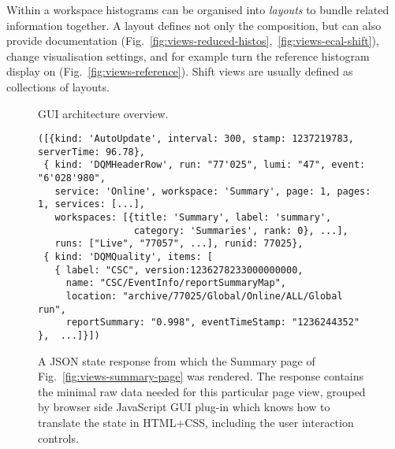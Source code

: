 \documentclass[a4paper]{jpconf}
\begin{document}
Within a workspace histograms can be organised into {\em layouts} to
bundle related information together.  A layout defines not only the
composition, but can also provide documentation
(Fig.~\ref{fig:views-reduced-histos},~\ref{fig:views-ecal-shift}),
change visualisation settings, and for example turn the reference
histogram display on (Fig.~\ref{fig:views-reference}).  Shift views
are usually defined as collections of layouts.

\begin{figure}[!tbp]
\begin{minipage}[b]{.40\textwidth}
\vspace{0em}
\begin{center}
\end{center}
\caption{\label{fig:arch}GUI architecture overview.}
\end{minipage}
\hfill
\begin{minipage}[b]{.55\textwidth}
\vspace{0em}
\begin{center}
\tiny
\begin{verbatim}
([{kind: 'AutoUpdate', interval: 300, stamp: 1237219783, serverTime: 96.78},
 { kind: 'DQMHeaderRow', run: "77'025", lumi: "47", event: "6'028'980",
   service: 'Online', workspace: 'Summary', page: 1, pages: 1, services: [...],
   workspaces: [{title: 'Summary', label: 'summary',
                 category: 'Summaries', rank: 0}, ...],
   runs: ["Live", "77057", ...], runid: 77025},
 { kind: 'DQMQuality', items: [
   { label: "CSC", version:1236278233000000000,
     name: "CSC/EventInfo/reportSummaryMap",
     location: "archive/77025/Global/Online/ALL/Global run",
     reportSummary: "0.998", eventTimeStamp: "1236244352" },  ...]}])
\end{verbatim}
\end{center}
\caption{\label{fig:json}A JSON state response from which the Summary
  page of Fig.~\ref{fig:views-summary-page} was rendered.  The
  response contains the minimal raw data needed for this particular
  page view, grouped by browser side JavaScript GUI plug-in which
  knows how to translate the state in HTML+CSS, including the user
  interaction controls.}
\end{minipage}
\end{figure}
\end{document}
